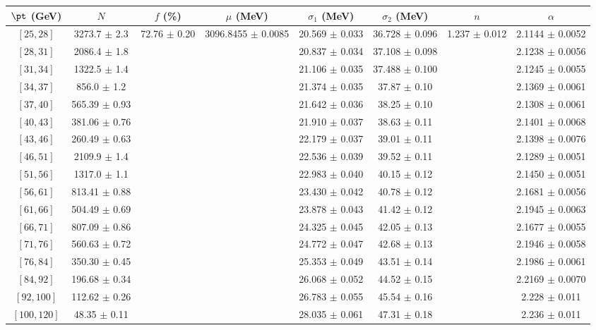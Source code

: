 \begin{tabular}{c||c|c|c|c|c|c|c}
$\pt$ (GeV) & $N$ & $f$ (\%) & $\mu$ (MeV) & $\sigma_1$ (MeV) & $\sigma_2$ (MeV) & $n$ & $\alpha$ \\
\hline
$[25, 28]$ & 3273.7 $\pm$ 2.3 & \multirow{17}{*}{72.76 $\pm$ 0.20} & \multirow{17}{*}{3096.8455 $\pm$ 0.0085} & 20.569 $\pm$ 0.033 & 36.728 $\pm$ 0.096 & \multirow{17}{*}{1.237 $\pm$ 0.012} & 2.1144 $\pm$ 0.0052\\
$[28, 31]$ & 2086.4 $\pm$ 1.8 &  &  & 20.837 $\pm$ 0.034 & 37.108 $\pm$ 0.098 &  & 2.1238 $\pm$ 0.0056\\
$[31, 34]$ & 1322.5 $\pm$ 1.4 &  &  & 21.106 $\pm$ 0.035 & 37.488 $\pm$ 0.100 &  & 2.1245 $\pm$ 0.0055\\
$[34, 37]$ & 856.0 $\pm$ 1.2 &  &  & 21.374 $\pm$ 0.035 & 37.87 $\pm$ 0.10 &  & 2.1369 $\pm$ 0.0061\\
$[37, 40]$ & 565.39 $\pm$ 0.93 &  &  & 21.642 $\pm$ 0.036 & 38.25 $\pm$ 0.10 &  & 2.1308 $\pm$ 0.0061\\
$[40, 43]$ & 381.06 $\pm$ 0.76 &  &  & 21.910 $\pm$ 0.037 & 38.63 $\pm$ 0.11 &  & 2.1401 $\pm$ 0.0068\\
$[43, 46]$ & 260.49 $\pm$ 0.63 &  &  & 22.179 $\pm$ 0.037 & 39.01 $\pm$ 0.11 &  & 2.1398 $\pm$ 0.0076\\
$[46, 51]$ & 2109.9 $\pm$ 1.4 &  &  & 22.536 $\pm$ 0.039 & 39.52 $\pm$ 0.11 &  & 2.1289 $\pm$ 0.0051\\
$[51, 56]$ & 1317.0 $\pm$ 1.1 &  &  & 22.983 $\pm$ 0.040 & 40.15 $\pm$ 0.12 &  & 2.1450 $\pm$ 0.0051\\
$[56, 61]$ & 813.41 $\pm$ 0.88 &  &  & 23.430 $\pm$ 0.042 & 40.78 $\pm$ 0.12 &  & 2.1681 $\pm$ 0.0056\\
$[61, 66]$ & 504.49 $\pm$ 0.69 &  &  & 23.878 $\pm$ 0.043 & 41.42 $\pm$ 0.12 &  & 2.1945 $\pm$ 0.0063\\
$[66, 71]$ & 807.09 $\pm$ 0.86 &  &  & 24.325 $\pm$ 0.045 & 42.05 $\pm$ 0.13 &  & 2.1677 $\pm$ 0.0055\\
$[71, 76]$ & 560.63 $\pm$ 0.72 &  &  & 24.772 $\pm$ 0.047 & 42.68 $\pm$ 0.13 &  & 2.1946 $\pm$ 0.0058\\
$[76, 84]$ & 350.30 $\pm$ 0.45 &  &  & 25.353 $\pm$ 0.049 & 43.51 $\pm$ 0.14 &  & 2.1986 $\pm$ 0.0061\\
$[84, 92]$ & 196.68 $\pm$ 0.34 &  &  & 26.068 $\pm$ 0.052 & 44.52 $\pm$ 0.15 &  & 2.2169 $\pm$ 0.0070\\
$[92, 100]$ & 112.62 $\pm$ 0.26 &  &  & 26.783 $\pm$ 0.055 & 45.54 $\pm$ 0.16 &  & 2.228 $\pm$ 0.011\\
$[100, 120]$ & 48.35 $\pm$ 0.11 &  &  & 28.035 $\pm$ 0.061 & 47.31 $\pm$ 0.18 &  & 2.236 $\pm$ 0.011\\
\end{tabular}
